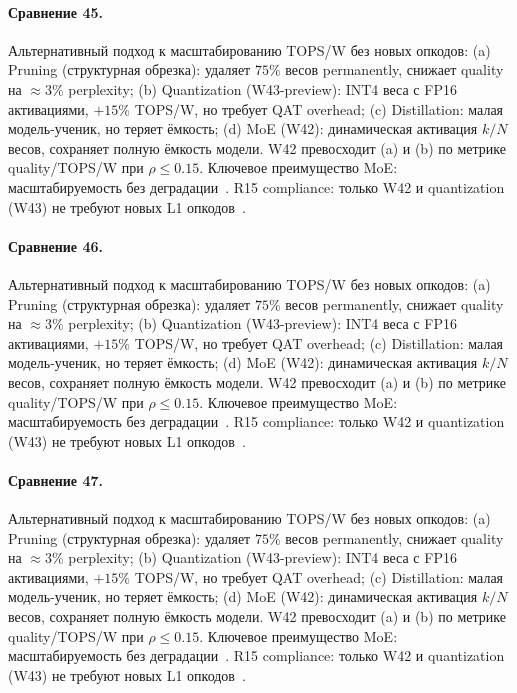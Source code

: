 \paragraph{Сравнение 45.} Альтернативный подход к масштабированию TOPS/W без новых опкодов: (a) Pruning (структурная обрезка): удаляет $75\%$ весов permanently, снижает quality на $\approx 3\%$ perplexity; (b) Quantization (W43-preview): INT4 веса с FP16 активациями, $+15\%$ TOPS/W, но требует QAT overhead; (c) Distillation: малая модель-ученик, но теряет ёмкость; (d) MoE (W42): динамическая активация $k/N$ весов, сохраняет полную ёмкость модели. W42 превосходит (a) и (b) по метрике quality/TOPS/W при $\rho \leq 0{.}15$. Ключевое преимущество MoE: масштабируемость без деградации~\cite{switch_transformer2021,mixtral2024}. R15 compliance: только W42 и quantization (W43) не требуют новых L1 опкодов~\cite{lee_gvsu_proof2021}.

\paragraph{Сравнение 46.} Альтернативный подход к масштабированию TOPS/W без новых опкодов: (a) Pruning (структурная обрезка): удаляет $75\%$ весов permanently, снижает quality на $\approx 3\%$ perplexity; (b) Quantization (W43-preview): INT4 веса с FP16 активациями, $+15\%$ TOPS/W, но требует QAT overhead; (c) Distillation: малая модель-ученик, но теряет ёмкость; (d) MoE (W42): динамическая активация $k/N$ весов, сохраняет полную ёмкость модели. W42 превосходит (a) и (b) по метрике quality/TOPS/W при $\rho \leq 0{.}15$. Ключевое преимущество MoE: масштабируемость без деградации~\cite{switch_transformer2021,mixtral2024}. R15 compliance: только W42 и quantization (W43) не требуют новых L1 опкодов~\cite{lee_gvsu_proof2021}.

\paragraph{Сравнение 47.} Альтернативный подход к масштабированию TOPS/W без новых опкодов: (a) Pruning (структурная обрезка): удаляет $75\%$ весов permanently, снижает quality на $\approx 3\%$ perplexity; (b) Quantization (W43-preview): INT4 веса с FP16 активациями, $+15\%$ TOPS/W, но требует QAT overhead; (c) Distillation: малая модель-ученик, но теряет ёмкость; (d) MoE (W42): динамическая активация $k/N$ весов, сохраняет полную ёмкость модели. W42 превосходит (a) и (b) по метрике quality/TOPS/W при $\rho \leq 0{.}15$. Ключевое преимущество MoE: масштабируемость без деградации~\cite{switch_transformer2021,mixtral2024}. R15 compliance: только W42 и quantization (W43) не требуют новых L1 опкодов~\cite{lee_gvsu_proof2021}.

